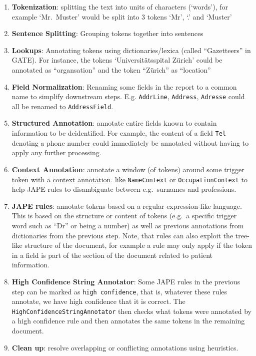 \begin{enumerate}
\def\labelenumi{\arabic{enumi}.}
\tightlist
\item
  \textbf{Tokenization}: splitting the text into units of characters
  (`words'), for example `Mr.~Muster' would be split into 3 tokens `Mr',
  `.' and `Muster'
\item
  \textbf{Sentence Splitting}: Grouping tokens together into sentences
\item
  \textbf{Lookups}: Annotating tokens using dictionaries/lexica (called
  ``Gazetteers'' in GATE). For instance, the tokens `Universitätsspital
  Zürich' could be annotated as ``organsation'' and the token ``Zürich''
  as ``location''
\item
  \textbf{Field Normalization}: Renaming some fields in the report to a
  common name to simplify downstream steps. E.g. \texttt{AddrLine},
  \texttt{Address}, \texttt{Adresse} could all be renamed to
  \texttt{AddressField}.
\item
  \textbf{Structured Annotation}: annotate entire fields known to
  contain information to be deidentified. For example, the content of a
  field \texttt{Tel} denoting a phone number could immediately be
  annotated without having to apply any further processing.
\item
  \textbf{Context Annotation}: annotate a window (of tokens) around some
  trigger token with a \href{components.md\#context-annotations}{context
  annotation}. like \texttt{NameContext} or \texttt{OccupationContext}
  to help JAPE rules to disambiguate between e.g.~surnames and
  professions.
\item
  \textbf{JAPE rules}: annotate tokens based on a regular
  expression-like language. This is based on the structure or content of
  tokens (e.g.~a specific trigger word such as ``Dr'' or being a number)
  as well as previous annotations from dictionaries from the previous
  step. Note, that rules can also exploit the tree-like structure of the
  document, for example a rule may only apply if the token in a field is
  part of the section of the document related to patient information.
\item
  \textbf{High Confidence String Annotator}: Some JAPE rules in the
  previous step can be marked as \texttt{high\ confidence}, that is,
  whatever these rules annotate, we have high confidence that it is
  correct. The \texttt{HighConfidenceStringAnnotator} then checks what
  tokens were annotated by a high confidence rule and then annotates the
  same tokens in the remaining document.
\item
  \textbf{Clean up}: resolve overlapping or conflicting annotations
  using heuristics.
\end{enumerate}

